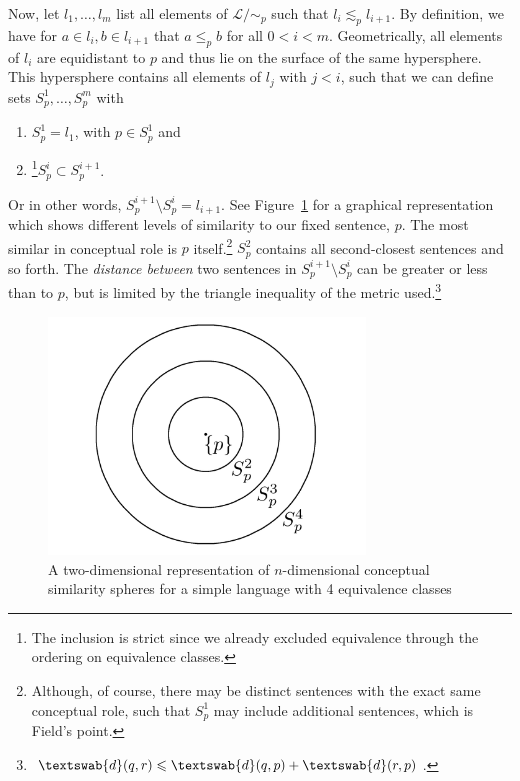 \documentclass[11pt, a4paper]{scrartcl}
\renewcommand{\i}[1]{\emph{#1}}
\renewcommand{\L}{\mathcal{L}}
\newcommand{\m}[1]{\textswab{#1}}
\begin{document}
Now, let $l_1, \ldots, l_m$ list all elements of $\L/\!\sim_p$ such that $l_i \lesssim_p l_{i+1}$. By definition, we have for $a \in l_i, b \in l_{i+1}$ that $a \leqslant_p b$ for all $0 < i < m$. Geometrically, all elements of $l_i$ are equidistant to $p$ and thus lie on the surface of the same hypersphere. This hypersphere contains all elements of $l_j$ with $j < i$, such that we can define sets $S^1_p, \ldots, S^m_p$ with 
\begin{enumerate}[label = (\roman*)]
    \item $S^1_p = l_1$, with $p \in S^1_p$ and 
    \item\footnote{The inclusion is strict since we already excluded equivalence through the ordering on equivalence classes.}$S^i_p \subset S^{i+1}_p$. 
\end{enumerate}
Or in other words, $S^{i+1}_p \setminus S^{i}_p = l_{i+1}$. See Figure~\ref{fig:spheres} for a graphical representation which shows different levels of similarity to our fixed sentence, $p$. The most similar in conceptual role is $p$ itself.\footnote{Although, of course, there may be distinct sentences with the exact same conceptual role,  such that $S^1_p$ may include additional sentences, which is Field's point.} $S^2_p$ contains all second-closest sentences and so forth. The \i{distance between} two sentences in $S^{i+1}_p\setminus S^{i}_p$ can be greater or less than to $p$, but is limited by the triangle inequality of the metric used.\footnote{$\m{d}(q,r) \leqslant \m{d}(q,p) + \m{d}(r,p)$.} 

\begin{figure}
	\centering
    \includegraphics[width=0.75\textwidth]{Similarityspheres.png}
    \caption{A two-dimensional representation of $n$-dimensional conceptual similarity spheres for a simple language with 4 equivalence classes\label{fig:spheres}}
\end{figure}
\end{document}
